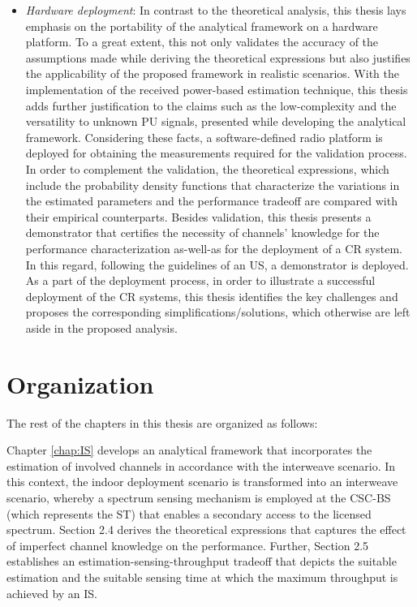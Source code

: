 \begin{itemize}
 
\item \textit{Hardware deployment}: 
In contrast to the theoretical analysis, this thesis lays emphasis on the portability of the analytical framework on a hardware platform. To a great extent, this not only validates the accuracy of the assumptions made while deriving the theoretical expressions but also justifies the applicability of the proposed framework in realistic scenarios. With the implementation of the received power-based estimation technique, this thesis adds further justification to the claims such as the low-complexity and the versatility to unknown PU signals, presented while developing the analytical framework. Considering these facts, a software-defined radio platform is deployed for obtaining the measurements required for the validation process. In order to complement the validation, the theoretical expressions, which include the probability density functions that characterize the variations in the estimated parameters and the performance tradeoff are compared with their empirical counterparts. Besides validation, this thesis presents a demonstrator that certifies the necessity of channels' knowledge for the performance characterization as-well-as for the deployment of a CR system. In this regard, following the guidelines of an US, a demonstrator is deployed. As a part of the deployment process, %
in order to illustrate a successful deployment of the CR systems, this thesis identifies the key challenges and proposes the corresponding simplifications/solutions, which otherwise are left aside in the proposed analysis.  
\end{itemize}

\section{Organization} 

The rest of the chapters in this thesis are organized as follows:

Chapter \ref{chap:IS} develops an analytical framework that incorporates the estimation of involved channels in accordance with the interweave scenario. In this context, the indoor deployment scenario is transformed into an interweave scenario, whereby a spectrum sensing mechanism is employed at the CSC-BS (which represents the ST) that enables a secondary access to the licensed spectrum. Section 2.4 derives the theoretical expressions that captures the effect of imperfect channel knowledge on the performance. Further, Section 2.5 establishes an estimation-sensing-throughput tradeoff that depicts the suitable estimation and the suitable sensing time at which the maximum throughput is achieved by an IS. 


